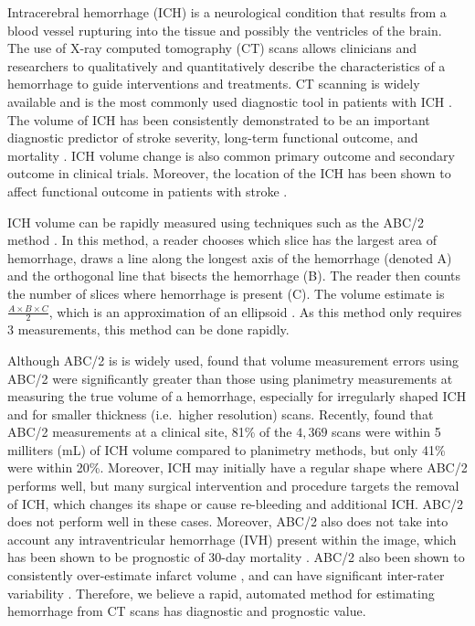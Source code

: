 \documentclass{elsarticle_nonatbib}\usepackage[]{graphicx}\usepackage[]{color}
\begin{document}
Intracerebral hemorrhage (ICH) is a neurological condition that results from a blood vessel rupturing into the tissue and possibly the ventricles of the brain.   The use of X-ray computed tomography (CT) scans allows clinicians and researchers to qualitatively and quantitatively describe the characteristics of a hemorrhage to guide interventions and treatments.  CT scanning is widely available and is the most commonly used diagnostic tool in patients with ICH \citep{sahni_management_2007}.  The volume of ICH has been consistently demonstrated to be an important diagnostic predictor of stroke severity, long-term functional outcome, and mortality \citep{broderick_volume_1993, hemphill_ich_2001, tuhrim_volume_1999}.  ICH volume change is also common primary outcome \citep{anderson_intensive_2008, anderson_effects_2010, qureshi_association_2011, mayer_recombinant_2005} and secondary outcome \citep{morgan_preliminary_2008_mistie, anderson_intensive_2008, morgan_preliminary_2008_clear} in clinical trials.  Moreover, the location of the ICH has been shown to affect functional outcome in patients with stroke \citep{rost_prediction_2008, castellanos_predictors_2005}.

ICH volume can be rapidly measured using techniques such as the ABC/2 method \citep{broderick_volume_1993}.  In this method, a reader chooses which slice has the largest area of hemorrhage, draws a line along the longest axis of the hemorrhage (denoted A) and the orthogonal line that bisects the hemorrhage (B).  The reader then counts the number of slices where hemorrhage is present (C).  The volume estimate is $\frac{A\times B\times C}{2}$, which is an approximation of an ellipsoid \citep{kothari_abcs_1996}.  As this method only requires 3 measurements, this method can be done rapidly. 

Although ABC/2 is is widely used, \citet{divani_abcs_2011} found that volume measurement errors using ABC/2 were significantly greater than those using planimetry measurements at measuring the true volume of a hemorrhage, especially for irregularly shaped ICH and for smaller thickness (i.e.~higher resolution) scans.  Recently, \citet{webb_accuracy_2015} found that ABC/2 measurements at a clinical site, 81\% of the $4,369$ scans were within 5 milliters (mL) of ICH volume compared to planimetry methods, but only 41\% were within 20\%.   Moreover, ICH may initially have a regular shape where ABC/2 performs well, but many surgical intervention and procedure targets the removal of ICH, which changes its shape or cause re-bleeding and additional ICH.  ABC/2 does not perform well in these cases.  Moreover, ABC/2 also does not take into account any intraventricular hemorrhage (IVH) present within the image, which has been shown to be prognostic of 30-day mortality \citep{hemphill_ich_2001, tuhrim_volume_1999}.  ABC/2 also been shown to consistently over-estimate infarct volume \citep{pedraza_reliability_2012}, and can have significant inter-rater variability \citep{hussein_reliability_2013}. Therefore, we believe a rapid, automated method for estimating hemorrhage from CT scans has diagnostic and prognostic value.
\end{document}
